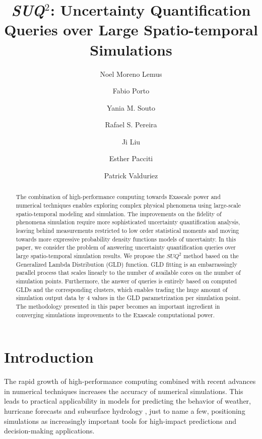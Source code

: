 \documentclass[11pt]{article}
\begin{document}
\title{\textit{SUQ}$^2$: Uncertainty Quantification Queries over Large Spatio-temporal Simulations}

\author[a]{Noel Moreno Lemus  }
\author[a]{Fabio Porto }
\author[a]{Yania M. Souto  }
\author[a] {Rafael S. Pereira }
\author[c]{Ji Liu}
\author[b]{Esther Pacciti}
\author[b]{Patrick Valduriez }


\maketitle

\begin{abstract}
The combination of high-performance computing
towards Exascale power 
and numerical techniques enables exploring complex physical phenomena using large-scale spatio-temporal modeling and simulation. The improvements on the fidelity of phenomena simulation require more sophisticated uncertainty quantification analysis, leaving behind measurements restricted to low order statistical moments and moving towards more expressive probability density functions models of uncertainty. In this paper, we consider the problem of answering uncertainty quantification queries over large spatio-temporal simulation results. We propose the $SUQ^2$ method based on the Generalized Lambda Distribution (GLD) function. GLD fitting is an embarrassingly parallel process that scales linearly to the number of available cores on the number of simulation points. Furthermore, the answer of queries is entirely based on computed GLDs and the corresponding clusters, which enables trading the huge amount of simulation output data by 4 values in the GLD parametrization per simulation point.
The methodology presented in this paper becomes an important ingredient in converging simulations improvements to the Exascale computational power. 


\end{abstract}



\section{Introduction}
\label{introduction}
The rapid growth of high-performance computing combined with recent advances in  numerical techniques increases the accuracy of numerical simulations.
This leads to practical applicability in models for predicting the behavior of weather, hurricane forecasts \cite{Tobergte2013} and  subsurface hydrology \cite{Baroni2014a}, just to name a few, positioning simulations as increasingly important tools for high-impact predictions and decision-making applications.
\end{document}
